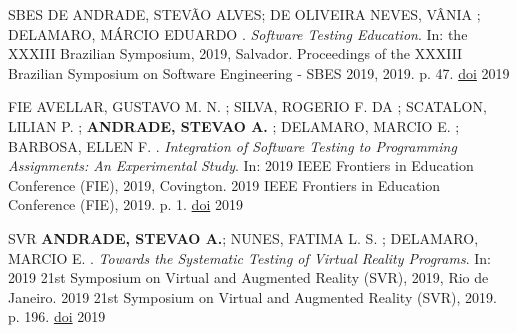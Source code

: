 \begin{cvhonors}
  \cvhonor
    {SBES \faFileTextO} %
    {DE ANDRADE, STEVÃO ALVES; DE OLIVEIRA NEVES, VÂNIA ; DELAMARO, MÁRCIO EDUARDO . \textit{Software Testing Education}. In: the XXXIII Brazilian Symposium, 2019, Salvador. Proceedings of the XXXIII Brazilian Symposium on Software Engineering - SBES 2019, 2019. p. 47.} %
    {\href{http://dx.doi.org/10.1145/3350768.3353903}{doi}} %
    {2019} %
    
  \cvhonor
    {FIE \faFileTextO} %
    {AVELLAR, GUSTAVO M. N. ; SILVA, ROGERIO F. DA ; SCATALON, LILIAN P. ; \textbf{ANDRADE, STEVAO A.} ; DELAMARO, MARCIO E. ; BARBOSA, ELLEN F. . \textit{Integration of Software Testing to Programming Assignments: An Experimental Study}. In: 2019 IEEE Frontiers in Education Conference (FIE), 2019, Covington. 2019 IEEE Frontiers in Education Conference (FIE), 2019. p. 1.} %
    {\href{http://dx.doi.org/10.1109/FIE43999.2019.9028519}{doi}} %
    {2019} %
    
  \cvhonor
    {SVR \faFileTextO} %
    {\textbf{ANDRADE, STEVAO A.}; NUNES, FATIMA L. S. ; DELAMARO, MARCIO E. . \textit{Towards the Systematic Testing of Virtual Reality Programs}. In: 2019 21st Symposium on Virtual and Augmented Reality (SVR), 2019, Rio de Janeiro. 2019 21st Symposium on Virtual and Augmented Reality (SVR), 2019. p. 196.} %
    {\href{http://dx.doi.org/10.1109/SVR.2019.00044}{doi}} %
    {2019} %
    



\end{cvhonors}
